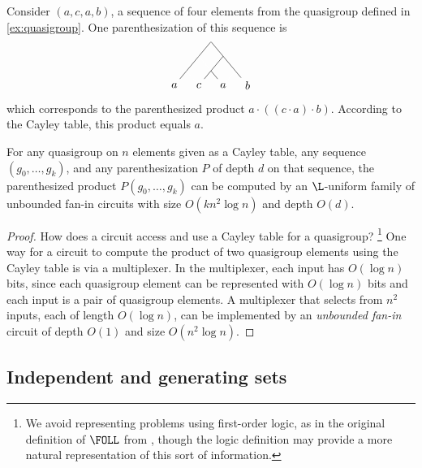 \begin{example}
  Consider $(a, c, a, b)$, a sequence of four elements from the quasigroup defined in \autoref{ex:quasigroup}.
  One parenthesization of this sequence is
  \begin{equation*}
    \begin{tikzpicture}[xscale=0.5, yscale=0.3]
      \node[minimum size=0pt, inner sep=0pt] {}
      child {
        child {
          child {node {$a$}}
          child[color=white] {}
        }
        child[color=white] {}
      }
      child {
        child {
          child {node {$c$}}
          child {node {$a$}}
        }
        child {
          child[color=white] {}
          child {node {$b$}}
        }
      };
    \end{tikzpicture}
  \end{equation*}
  which corresponds to the parenthesized product $a \cdot ((c \cdot a) \cdot b)$.
  According to the Cayley table, this product equals $a$.
\end{example}

\begin{lemma}\label{lem:product}
  For any quasigroup on $n$ elements given as a Cayley table, any sequence $(g_0, \dotsc, g_k)$, and any parenthesization $P$ of depth $d$ on that sequence, the parenthesized product $P(g_0, \dotsc, g_k)$ can be computed by an $\L$-uniform family of unbounded fan-in circuits with size $O(k n^2 \log n)$ and depth $O(d)$.
\end{lemma}
\begin{proof}
  How does a circuit access and use a Cayley table for a quasigroup?%
  \footnote{We avoid representing problems using first-order logic, as in the original definition of $\FOLL$ from \autocite{bklm01}, though the logic definition may provide a more natural representation of this sort of information.}
  One way for a circuit to compute the product of two quasigroup elements using the Cayley table is via a multiplexer.
  In the multiplexer, each input has $O(\log n)$ bits, since each quasigroup element can be represented with $O(\log n)$ bits and each input is a pair of quasigroup elements.
  A multiplexer that selects from $n^2$ inputs, each of length $O(\log n)$, can be implemented by an \emph{unbounded fan-in} circuit of depth $O(1)$ and size $O(n^2 \log n)$.
\end{proof}

\subsection{Independent and generating sets}

